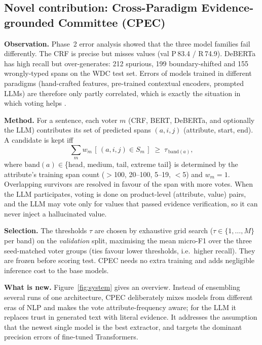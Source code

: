 \documentclass[10pt,twocolumn,a4paper]{article}
\begin{document}
\subsection{Novel contribution: Cross-Paradigm Evidence-grounded Committee (CPEC)}
\textbf{Observation.} Phase~2 error analysis showed that the three model families fail differently. The CRF is precise but misses values (val P\,83.4 / R\,74.9). DeBERTa has high recall but over-generates: 212 spurious, 199 boundary-shifted and 155 wrongly-typed spans on the WDC test set. Errors of models trained in different paradigms (hand-crafted features, pre-trained contextual encoders, prompted LLMs) are therefore only partly correlated, which is exactly the situation in which voting helps \cite{dietterich2000}.

\textbf{Method.} For a sentence, each voter $m$ (CRF, BERT, DeBERTa, and optionally the LLM) contributes its set of predicted spans $(a, i, j)$ (attribute, start, end). A candidate is kept iff
\[\textstyle\sum_m w_m\,[\,(a,i,j)\in S_m\,] \;\ge\; \tau_{\,\mathrm{band}(a)},\]
where $\mathrm{band}(a)\in$\{head, medium, tail, extreme tail\} is determined by the attribute's training span count ($>$100, 20--100, 5--19, $<$5) and $w_m{=}1$. Overlapping survivors are resolved in favour of the span with more votes. When the LLM participates, voting is done on product-level (attribute, value) pairs, and the LLM may vote only for values that passed evidence verification, so it can never inject a hallucinated value.

\textbf{Selection.} The thresholds $\tau$ are chosen by exhaustive grid search ($\tau\in\{1,\dots,M\}$ per band) on the \emph{validation} split, maximising the mean micro-F1 over the three seed-matched voter groups (ties favour lower thresholds, i.e.\ higher recall). They are frozen before scoring test. CPEC needs no extra training and adds negligible inference cost to the base models.

\textbf{What is new.} Figure~\ref{fig:system} gives an overview. Instead of ensembling several runs of one architecture, CPEC deliberately mixes models from different eras of NLP and makes the vote attribute-frequency aware; for the LLM it replaces trust in generated text with literal evidence. It addresses the assumption that the newest single model is the best extractor, and targets the dominant precision errors of fine-tuned Transformers.
\end{document}
